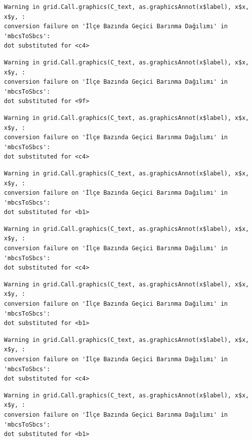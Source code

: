 \documentclass[
  11pt,
  a4paper,
  DIV=11,
  numbers=noendperiod]{scrartcl}
\begin{document}
\begin{verbatim}
Warning in grid.Call.graphics(C_text, as.graphicsAnnot(x$label), x$x, x$y, :
conversion failure on 'İlçe Bazında Geçici Barınma Dağılımı' in 'mbcsToSbcs':
dot substituted for <c4>
\end{verbatim}

\begin{verbatim}
Warning in grid.Call.graphics(C_text, as.graphicsAnnot(x$label), x$x, x$y, :
conversion failure on 'İlçe Bazında Geçici Barınma Dağılımı' in 'mbcsToSbcs':
dot substituted for <9f>
\end{verbatim}

\begin{verbatim}
Warning in grid.Call.graphics(C_text, as.graphicsAnnot(x$label), x$x, x$y, :
conversion failure on 'İlçe Bazında Geçici Barınma Dağılımı' in 'mbcsToSbcs':
dot substituted for <c4>
\end{verbatim}

\begin{verbatim}
Warning in grid.Call.graphics(C_text, as.graphicsAnnot(x$label), x$x, x$y, :
conversion failure on 'İlçe Bazında Geçici Barınma Dağılımı' in 'mbcsToSbcs':
dot substituted for <b1>
\end{verbatim}

\begin{verbatim}
Warning in grid.Call.graphics(C_text, as.graphicsAnnot(x$label), x$x, x$y, :
conversion failure on 'İlçe Bazında Geçici Barınma Dağılımı' in 'mbcsToSbcs':
dot substituted for <c4>
\end{verbatim}

\begin{verbatim}
Warning in grid.Call.graphics(C_text, as.graphicsAnnot(x$label), x$x, x$y, :
conversion failure on 'İlçe Bazında Geçici Barınma Dağılımı' in 'mbcsToSbcs':
dot substituted for <b1>
\end{verbatim}

\begin{verbatim}
Warning in grid.Call.graphics(C_text, as.graphicsAnnot(x$label), x$x, x$y, :
conversion failure on 'İlçe Bazında Geçici Barınma Dağılımı' in 'mbcsToSbcs':
dot substituted for <c4>
\end{verbatim}

\begin{verbatim}
Warning in grid.Call.graphics(C_text, as.graphicsAnnot(x$label), x$x, x$y, :
conversion failure on 'İlçe Bazında Geçici Barınma Dağılımı' in 'mbcsToSbcs':
dot substituted for <b1>
\end{verbatim}
\end{document}
